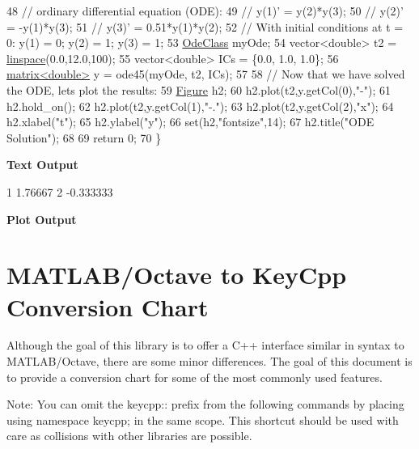 \begin{DoxyCodeInclude}
48     \textcolor{comment}{// ordinary differential equation (ODE):}
49     \textcolor{comment}{// y(1)' = y(2)*y(3);}
50     \textcolor{comment}{// y(2)' = -y(1)*y(3);}
51     \textcolor{comment}{// y(3)' = 0.51*y(1)*y(2);}
52     \textcolor{comment}{// With initial conditions at t = 0: y(1) = 0; y(2) = 1; y(3) = 1;}
53     \hyperlink{class_ode_class}{OdeClass} myOde;
54     vector<double> t2 = \hyperlink{namespacekeycpp_ab57eee495c93eb18ebf8c8ccf4d44e74}{linspace}(0.0,12.0,100);
55     vector<double> ICs = \{0.0, 1.0, 1.0\};
56     \hyperlink{classkeycpp_1_1matrix}{matrix<double>} y = ode45(myOde, t2, ICs);
57     
58     \textcolor{comment}{// Now that we have solved the ODE, lets plot the results:}
59     \hyperlink{classkeycpp_1_1_figure}{Figure} h2;
60     h2.plot(t2,y.getCol(0),\textcolor{stringliteral}{"-"});
61     h2.hold\_on();
62     h2.plot(t2,y.getCol(1),\textcolor{stringliteral}{"-."});
63     h2.plot(t2,y.getCol(2),\textcolor{stringliteral}{"x"});
64     h2.xlabel(\textcolor{stringliteral}{"t"});
65     h2.ylabel(\textcolor{stringliteral}{"y"});
66     \textcolor{keyword}{set}(h2,\textcolor{stringliteral}{"fontsize"},14);
67     h2.title(\textcolor{stringliteral}{"ODE Solution"});
68 
69     \textcolor{keywordflow}{return} 0;
70 \}
\end{DoxyCodeInclude}
 \par
 {\bfseries {\ttfamily Text} Output} 
\begin{DoxyCodeInclude}
1 1.76667
2 -0.333333
\end{DoxyCodeInclude}
 \par
 {\bfseries {\ttfamily Plot} Output}  \par
  \par


\section*{M\-A\-T\-L\-A\-B/\-Octave to Key\-Cpp Conversion Chart}

Although the goal of this library is to offer a C++ interface similar in syntax to M\-A\-T\-L\-A\-B/\-Octave, there are some minor differences. The goal of this document is to provide a conversion chart for some of the most commonly used features.

Note\-: You can omit the {\ttfamily keycpp\-:\-:} prefix from the following commands by placing {\ttfamily using namespace keycpp;} in the same scope. This shortcut should be used with care as collisions with other libraries are possible.

